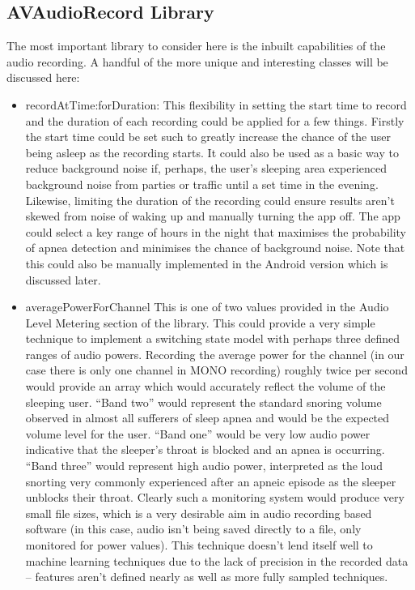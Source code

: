 \subsection{AVAudioRecord Library}
The most important library to consider here is the inbuilt capabilities of the audio recording. A handful of the more unique and interesting classes will be discussed here:
\begin{itemize}
\item recordAtTime:forDuration: This flexibility in setting the start time to record and the duration of each recording could be applied for a few things. Firstly the start time could be set such to greatly increase the chance of the user being asleep as the recording starts. It could also be used as a basic way to reduce background noise if, perhaps, the user’s sleeping area experienced background noise from parties or traffic until a set time in the evening. Likewise, limiting the duration of the recording could ensure results aren’t skewed from noise of waking up and manually turning the app off. The app could select a key range of hours in the night that maximises the probability of apnea detection and minimises the chance of background noise. Note that this could also be manually implemented in the Android version which is discussed later.
\item averagePowerForChannel This is one of two values provided in the Audio Level Metering section of the library. This could provide a very simple technique to implement a switching state model with perhaps three defined ranges of audio powers. Recording the average power for the channel (in our case there is only one channel in MONO recording) roughly twice per second would provide an array which would accurately reflect the volume of the sleeping user. “Band two” would represent the standard snoring volume observed in almost all sufferers of sleep apnea and would be the expected volume level for the user. “Band one” would be very low audio power indicative that the sleeper’s throat is blocked and an apnea is occurring. “Band three” would represent high audio power, interpreted as the loud snorting very commonly experienced after an apneic episode as the sleeper unblocks their throat. Clearly such a monitoring system would produce very small file sizes, which is a very desirable aim in audio recording based software (in this case, audio isn’t being saved directly to a file, only monitored for power values). This technique doesn’t lend itself well to machine learning techniques due to the lack of precision in the recorded data – features aren’t defined nearly as well as more fully sampled techniques.

\end{itemize}
